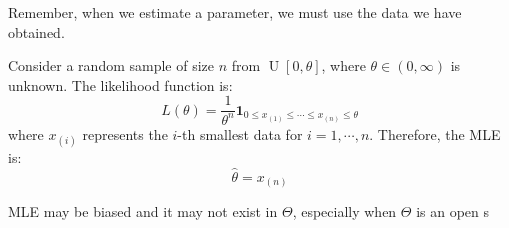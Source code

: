\documentclass{huhtakm-template-book-v2}
\DeclareMathOperator{\U}{U}
\begin{document}
\begin{rem}
	Remember, when we estimate a parameter, we must use the data we have obtained.
\end{rem}
\begin{eg}
	Consider a random sample of size $n$ from $\U[0,\theta]$, where $\theta\in(0,\infty)$ is unknown. The likelihood function is:
	\begin{equation*}
		L(\theta)=\frac{1}{\theta^{n}}\mathbf{1}_{0\leq x_{(1)}\leq\cdots\leq x_{(n)}\leq\theta}
	\end{equation*}
	where $x_{(i)}$ represents the $i$-th smallest data for $i=1,\cdots,n$. Therefore, the MLE is:
	\begin{equation*}
		\hat{\theta}=x_{(n)}
	\end{equation*}
\end{eg}
\begin{rem}
	MLE may be biased and it may not exist in $\Theta$, especially when $\Theta$ is an open s\end{rem}
\end{document}
